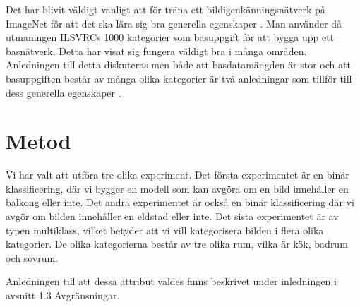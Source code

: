 \documentclass[]{kththesis}
\begin{document}
Det har blivit väldigt vanligt att för-träna ett bildigenkänningsnätverk på ImageNet för att det ska lära sig bra generella egenskaper \parencite{huh2016makes}. Man använder då utmaningen ILSVRCs 1000 kategorier som basuppgift för att bygga upp ett basnätverk. Detta har visat sig fungera väldigt bra i många områden. Anledningen till detta diskuteras men både att basdatamängden är stor och att basuppgiften består av många olika kategorier är två anledningar som tillför till dess generella egenskaper \parencite{huh2016makes}.

\chapter{Metod}
Vi har valt att utföra tre olika experiment. Det första experimentet är en binär klassificering, där vi bygger en modell som kan avgöra om en bild innehåller en balkong eller inte. Det andra experimentet är också en binär klassificering där vi avgör om bilden innehåller en eldstad eller inte. Det sista experimentet är av typen multiklass, vilket betyder att vi vill kategorisera bilden i flera olika kategorier. De olika kategorierna består av tre olika rum, vilka är kök, badrum och sovrum.

Anledningen till att dessa attribut valdes finns beskrivet under inledningen i avsnitt 1.3 Avgränsningar.
\end{document}
